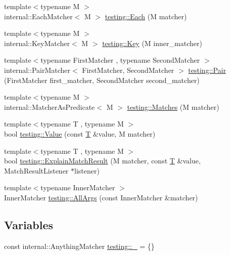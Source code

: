 \begin{DoxyCompactItemize}
\item 
{\footnotesize template$<$typename M $>$ }\\internal\+::\+Each\+Matcher$<$ M $>$ \hyperlink{namespacetesting_a42743c985b1e02dc373ab7517ca1e740}{testing\+::\+Each} (M matcher)
\item 
{\footnotesize template$<$typename M $>$ }\\internal\+::\+Key\+Matcher$<$ M $>$ \hyperlink{namespacetesting_a6212e76b542f4ffd3079de59092a826a}{testing\+::\+Key} (M inner\+\_\+matcher)
\item 
{\footnotesize template$<$typename First\+Matcher , typename Second\+Matcher $>$ }\\internal\+::\+Pair\+Matcher$<$ First\+Matcher, Second\+Matcher $>$ \hyperlink{namespacetesting_ac7520de8af26d3085513eeeb68561889}{testing\+::\+Pair} (First\+Matcher first\+\_\+matcher, Second\+Matcher second\+\_\+matcher)
\item 
{\footnotesize template$<$typename M $>$ }\\internal\+::\+Matcher\+As\+Predicate$<$ M $>$ \hyperlink{namespacetesting_ad53b509ae9cd51040d67f668f99702ae}{testing\+::\+Matches} (M matcher)
\item 
{\footnotesize template$<$typename T , typename M $>$ }\\bool \hyperlink{namespacetesting_ae44c50a3a7f0a46f05c8a0b0592b4a62}{testing\+::\+Value} (const \hyperlink{functions__7_8js_adf1f3edb9115acb0a1e04209b7a9937b}{T} \&value, M matcher)
\item 
{\footnotesize template$<$typename T , typename M $>$ }\\bool \hyperlink{namespacetesting_a6d5fbd5104dafc63bf705dafbcb5ce18}{testing\+::\+Explain\+Match\+Result} (M matcher, const \hyperlink{functions__7_8js_adf1f3edb9115acb0a1e04209b7a9937b}{T} \&value, Match\+Result\+Listener $\ast$listener)
\item 
{\footnotesize template$<$typename Inner\+Matcher $>$ }\\Inner\+Matcher \hyperlink{namespacetesting_a2522e94b71f88fbfbbcf6942cd0c6ee0}{testing\+::\+All\+Args} (const Inner\+Matcher \&matcher)
\end{DoxyCompactItemize}
\subsection*{Variables}
\begin{DoxyCompactItemize}
\item 
const internal\+::\+Anything\+Matcher \hyperlink{namespacetesting_a4ba77a3f5b67166ff1b59d96a32346a2}{testing\+::\+\_\+} = \{\}
\end{DoxyCompactItemize}


